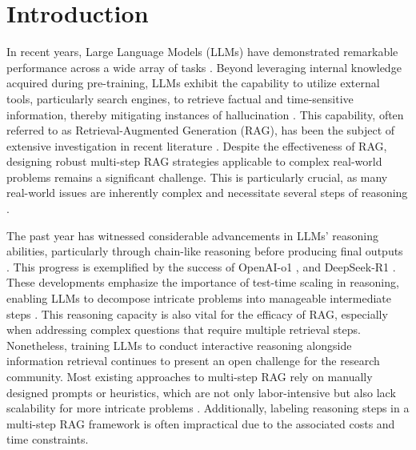 \documentclass{article}
\begin{document}
\section{Introduction}

In recent years, Large Language Models (LLMs) have demonstrated remarkable performance across a wide array of tasks \cite{qwen25-tech-report,baichuan-tech-report,deepseek-r1,claude-37-sonnet}. Beyond leveraging internal knowledge acquired during pre-training, LLMs exhibit the capability to utilize external tools, particularly search engines, to retrieve factual and time-sensitive information, thereby mitigating instances of hallucination \cite{toolformer,hugginggpt,agentboard,button}. This capability, often referred to as Retrieval-Augmented Generation (RAG), has been the subject of extensive investigation in recent literature \cite{rag-survey,crag,selfrag,retrieval-survey}.
Despite the effectiveness of RAG, designing robust multi-step RAG strategies applicable to complex real-world problems remains a significant challenge. This is particularly crucial, as many real-world issues are inherently complex and necessitate several steps of reasoning \cite{lpkg,iterretgen,ircot}.

The past year has witnessed considerable advancements in LLMs' reasoning abilities, particularly through chain-like reasoning before producing final outputs \cite{cot,star}.
This progress is exemplified by the success of OpenAI-o1 \cite{openai-o1}, and DeepSeek-R1 \cite{deepseek-r1}. 
These developments emphasize the importance of test-time scaling in reasoning, enabling LLMs to decompose intricate problems into manageable intermediate steps \cite{test-time-scaling,s1}. This reasoning capacity is also vital for the efficacy of RAG, especially when addressing complex questions that require multiple retrieval steps. Nonetheless, training LLMs to conduct interactive reasoning alongside information retrieval continues to present an open challenge for the research community.
Most existing approaches to multi-step RAG rely on manually designed prompts or heuristics, which are not only labor-intensive but also lack scalability for more intricate problems \cite{iterretgen,ircot,selfask}. Additionally, labeling reasoning steps in a multi-step RAG framework is often impractical due to the associated costs and time constraints.
\end{document}
